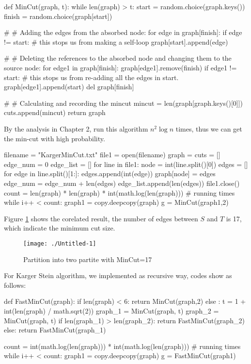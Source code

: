 \documentclass[11pt]{article}
\theoremstyle{plain}
\theoremstyle{definition}
\theoremstyle{remark}
\begin{document}
	
\begin{python}
def MinCut(graph, t):
    while len(graph) > t:
        start = random.choice(graph.keys())
        finish = random.choice(graph[start])

    # # Adding the edges from the absorbed node:
        for edge in graph[finish]:
            if edge != start:  # this stops us from making a self-loop
                graph[start].append(edge)
                
    # # Deleting the references to the absorbed node and changing them to the source node:
        for edge1 in graph[finish]:
            graph[edge1].remove(finish)
            if edge1 != start:  # this stops us from re-adding all the edges in start.
                graph[edge1].append(start)
        del graph[finish]

    # # Calculating and recording the mincut
    mincut = len(graph[graph.keys()[0]])
    cuts.append(mincut)
    return graph
\end{python}

By the analysis in Chapter 2, run this algorithm $ n^2\log n$ times, thus we can get the min-cut with high probability.

\begin{python}
	filename = "KargerMinCut.txt"
	file1 = open(filename)
	graph = {}
	cuts = []
	edge_num = 0
	edge_list = []
	for line in file1:
	    node = int(line.split()[0])
	    edges = []
	    for edge in line.split()[1:]:
	        edges.append(int(edge))      
	    graph[node] = edges
	    edge_num = edge_num + len(edges)
	    edge_list.append(len(edges))
	file1.close()
	count = len(graph) * len(graph) * int(math.log(len(graph))) # running times
	while i++ < count:
	    graph1 = copy.deepcopy(graph)
	    g = MinCut(graph1,2)
\end{python}

Figure \ref{fig:min-cut} shows the corelated result, the number of edges between $ S $ and $ T $ is 17, which indicate the minimum cut size.
	\begin{figure}[h]
	\centering
	\texttt{[image: ./Untitled-1]}
	\caption{Partition into two partite with MinCut=17}
	\label{fig:min-cut}
	\end{figure}
	
For Karger Stein algorithm, we implemented as recursive way, codes show as follows:

\begin{python}
def FastMinCut(graph):
    if len(graph) < 6:
        return MinCut(graph,2)
    else :
        t = 1 + int(len(graph) / math.sqrt(2))
        graph_1 = MinCut(graph, t)
        graph_2 = MinCut(graph, t)
        if len(graph_1) > len(graph_2):
            return FastMinCut(graph_2)
        else:
            return FastMinCut(graph_1)

count = int(math.log(len(graph))) * int(math.log(len(graph))) # running times
	while i++ < count:
	    graph1 = copy.deepcopy(graph)
	    g = FastMinCut(graph1)
\end{python}
	
\end{document}
